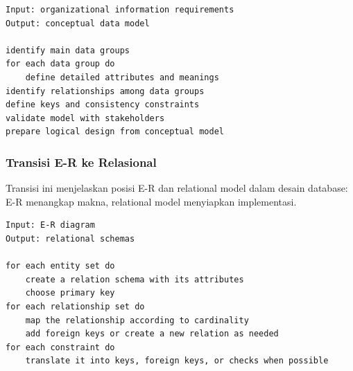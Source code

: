 \begin{lstlisting}[caption={Pseudocode pemodelan data awal}, label={lst:data-modeling-procedure}]
Input: organizational information requirements
Output: conceptual data model

identify main data groups
for each data group do
    define detailed attributes and meanings
identify relationships among data groups
define keys and consistency constraints
validate model with stakeholders
prepare logical design from conceptual model
\end{lstlisting}

\subsubsection{Transisi E-R ke Relasional}

\begin{jawab}
Transisi ini menjelaskan posisi E-R dan relational model dalam desain database: E-R menangkap makna, relational model menyiapkan implementasi.
\end{jawab}

\begin{lstlisting}[caption={Pseudocode transisi model konseptual ke logis}, label={lst:er-to-relational-highlevel}]
Input: E-R diagram
Output: relational schemas

for each entity set do
    create a relation schema with its attributes
    choose primary key
for each relationship set do
    map the relationship according to cardinality
    add foreign keys or create a new relation as needed
for each constraint do
    translate it into keys, foreign keys, or checks when possible
\end{lstlisting}
